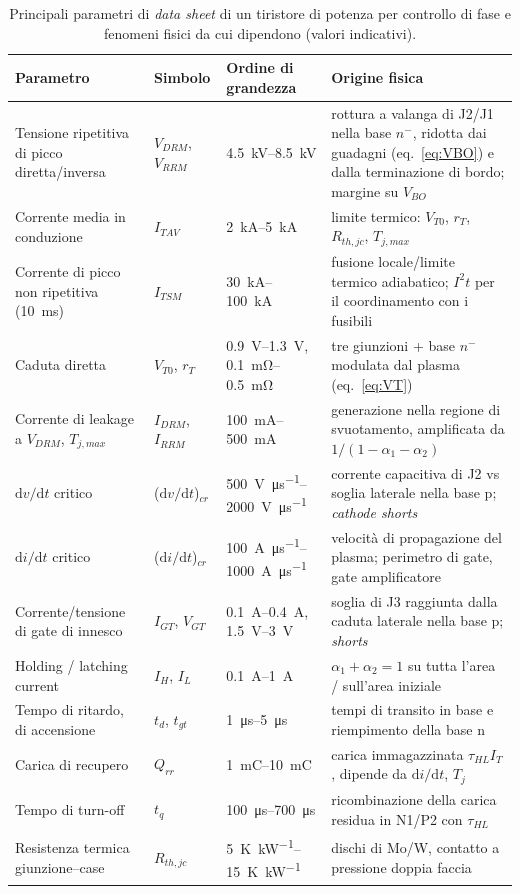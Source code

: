 \documentclass[11pt,a4paper]{article}
\newcommand{\IH}{\ensuremath{I_H}}
\newcommand{\IL}{\ensuremath{I_L}}
\newcommand{\VBO}{\ensuremath{V_{BO}}}
\newcommand{\VDRM}{\ensuremath{V_{DRM}}}
\newcommand{\VRRM}{\ensuremath{V_{RRM}}}
\newcommand{\tq}{\ensuremath{t_q}}
\newcommand{\dvdt}{\ensuremath{\mathrm{d}v/\mathrm{d}t}}
\newcommand{\didt}{\ensuremath{\mathrm{d}i/\mathrm{d}t}}
\newcommand{\en}[1]{\emph{#1}}   %
\begin{document}
\begin{table}[htbp]
\centering\small
\begin{tabular}{@{}>{\raggedright\arraybackslash}p{3.6cm}>{\raggedright\arraybackslash}p{1.7cm}>{\raggedright\arraybackslash}p{3.2cm}>{\raggedright\arraybackslash}p{6.3cm}@{}}
\toprule
Parametro & Simbolo & Ordine di grandezza & Origine fisica \\
\midrule
Tensione ripetitiva di picco diretta/inversa & $\VDRM$, $\VRRM$ & \qtyrange{4.5}{8.5}{\kV} & rottura a valanga di J2/J1 nella base $n^-$, ridotta dai guadagni (eq.~\ref{eq:VBO}) e dalla terminazione di bordo; margine su $\VBO$ \\
Corrente media in conduzione & $I_{TAV}$ & \qtyrange{2}{5}{\kA} & limite termico: $V_{T0}$, $r_T$, $R_{th,jc}$, $T_{j,max}$ \\
Corrente di picco non ripetitiva (\qty{10}{\ms}) & $I_{TSM}$ & \qtyrange{30}{100}{\kA} & fusione locale/limite termico adiabatico; $I^2t$ per il coordinamento con i fusibili \\
Caduta diretta & $V_{T0}$, $r_T$ & \qtyrange{0.9}{1.3}{\V}, \qtyrange{0.1}{0.5}{\milli\ohm} & tre giunzioni + base $n^-$ modulata dal plasma (eq.~\ref{eq:VT}) \\
Corrente di leakage a $\VDRM$, $T_{j,max}$ & $I_{DRM}$, $I_{RRM}$ & \qtyrange{100}{500}{\mA} & generazione nella regione di svuotamento, amplificata da $1/(1-\alpha_1-\alpha_2)$ \\
$\dvdt$ critico & ($\dvdt$)$_{cr}$ & \qtyrange{500}{2000}{\V\per\us} & corrente capacitiva di J2 vs soglia laterale nella base p; \en{cathode shorts} \\
$\didt$ critico & ($\didt$)$_{cr}$ & \qtyrange{100}{1000}{\A\per\us} & velocità di propagazione del plasma; perimetro di gate, gate amplificatore \\
Corrente/tensione di gate di innesco & $I_{GT}$, $V_{GT}$ & \qtyrange{0.1}{0.4}{\A}, \qtyrange{1.5}{3}{\V} & soglia di J3 raggiunta dalla caduta laterale nella base p; \en{shorts} \\
Holding / latching current & $\IH$, $\IL$ & \qtyrange{0.1}{1}{\A} & $\alpha_1+\alpha_2=1$ su tutta l'area / sull'area iniziale \\
Tempo di ritardo, di accensione & $t_d$, $t_{gt}$ & \qtyrange{1}{5}{\us} & tempi di transito in base e riempimento della base n \\
Carica di recupero & $Q_{rr}$ & \qtyrange{1}{10}{\milli\coulomb} & carica immagazzinata $\tau_{HL}I_T$, dipende da $\didt$, $T_j$ \\
Tempo di turn-off & $\tq$ & \qtyrange{100}{700}{\us} & ricombinazione della carica residua in N1/P2 con $\tau_{HL}$ \\
Resistenza termica giunzione--case & $R_{th,jc}$ & \qtyrange{5}{15}{\K\per\kW} & dischi di Mo/W, contatto a pressione doppia faccia \\
\bottomrule
\end{tabular}
\caption{Principali parametri di \en{data sheet} di un tiristore di potenza per controllo di fase e fenomeni fisici da cui dipendono (valori indicativi).}
\label{tab:params}
\end{table}
\end{document}
